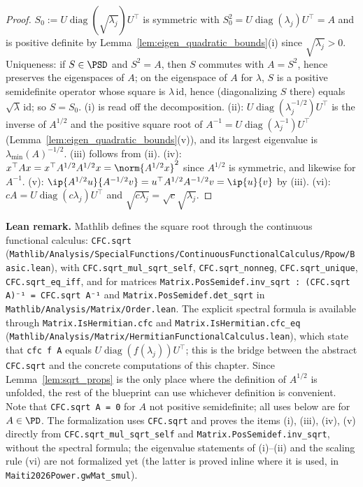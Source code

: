 \begin{proof}
$S_0 := U\operatorname{diag}(\sqrt{\lambda_j})U^\top$ is symmetric with $S_0^2 =
U\operatorname{diag}(\lambda_j)U^\top = A$ and is positive definite by
Lemma~\ref{lem:eigen_quadratic_bounds}(i) since $\sqrt{\lambda_j} > 0$. Uniqueness: if $S \in
\PSD$ and $S^2 = A$, then $S$ commutes with $A = S^2$, hence preserves the eigenspaces of $A$;
on the eigenspace of $A$ for $\lambda$, $S$ is a positive semidefinite operator whose square is
$\lambda\,\mathrm{id}$, hence (diagonalizing $S$ there) equals $\sqrt\lambda\,\mathrm{id}$; so
$S = S_0$. (i) is read off the decomposition. (ii): $U\operatorname{diag}(\lambda_j^{-1/2})U^\top$
is the inverse of $A^{1/2}$ and the positive square root of $A^{-1} =
U\operatorname{diag}(\lambda_j^{-1})U^\top$ (Lemma~\ref{lem:eigen_quadratic_bounds}(v)), and its
largest eigenvalue is $\lambda_{\min}(A)^{-1/2}$. (iii) follows from (ii). (iv): $x^\top A x =
x^\top A^{1/2} A^{1/2} x = \norm{A^{1/2}x}^2$ since $A^{1/2}$ is symmetric, and likewise for
$A^{-1}$. (v): $\ip{A^{1/2}u}{A^{-1/2}v} = u^\top A^{1/2}A^{-1/2} v = \ip{u}{v}$ by (iii).
(vi): $cA = U\operatorname{diag}(c\lambda_j)U^\top$ and $\sqrt{c\lambda_j} = \sqrt c\sqrt{\lambda_j}$.
\end{proof}

\textbf{Lean remark.} Mathlib defines the square root through the continuous functional
calculus: \texttt{CFC.sqrt} (\texttt{Mathlib/Analysis/SpecialFunctions/ContinuousFunctionalCalculus/Rpow/Basic.lean}),
with \texttt{CFC.sqrt\_mul\_sqrt\_self}, \texttt{CFC.sqrt\_nonneg}, \texttt{CFC.sqrt\_unique},
\texttt{CFC.sqrt\_eq\_iff}, and for matrices \texttt{Matrix.PosSemidef.inv\_sqrt :
(CFC.sqrt A)⁻¹ = CFC.sqrt A⁻¹} and \texttt{Matrix.PosSemidef.det\_sqrt} in
\texttt{Mathlib/Analysis/Matrix/Order.lean}. The explicit spectral formula is available through
\texttt{Matrix.IsHermitian.cfc} and \texttt{Matrix.IsHermitian.cfc\_eq}
(\texttt{Mathlib/Analysis/Matrix/HermitianFunctionalCalculus.lean}), which state that \texttt{cfc f A} equals $U\operatorname{diag}(f(\lambda_j))U^\top$; this is
the bridge between the abstract \texttt{CFC.sqrt} and the concrete computations of this chapter.
Since Lemma~\ref{lem:sqrt_props} is the only place where the definition of $A^{1/2}$ is unfolded,
the rest of the blueprint can use whichever definition is convenient. Note that
\texttt{CFC.sqrt A = 0} for $A$ not positive semidefinite; all uses below are for $A \in \PD$.
The formalization uses \texttt{CFC.sqrt} and proves the items (i), (iii), (iv), (v) directly from
\texttt{CFC.sqrt\_mul\_sqrt\_self} and \texttt{Matrix.PosSemidef.inv\_sqrt}, without the spectral
formula; the eigenvalue statements of (i)--(ii) and the scaling rule (vi) are not formalized yet
(the latter is proved inline where it is used, in \texttt{Maiti2026Power.gwMat\_smul}).

